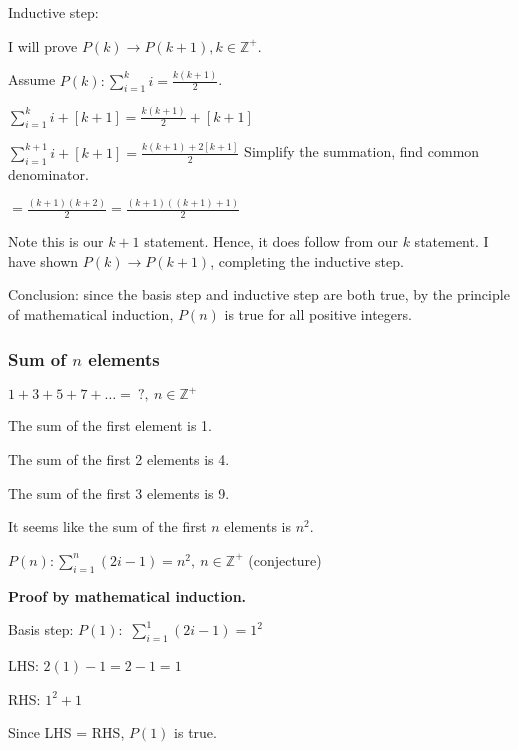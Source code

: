 \documentclass[english,openany]{book}
\begin{document}
    Inductive step:

    I will prove $P(k) \rightarrow P(k+1), k \in \mathbb Z^+$.

    Assume $P(k): \sum_{i=1}^{k} i = \frac{k(k+1)}{2}$.

    \noindent{}

    $\sum_{i=1}^{k} i + [k+1] = \frac{k(k+1)}{2} + [k+1]$

    $\sum_{i=1}^{k+1} i + [k+1] = \frac{k(k+1)+2[k+1]}{2}$ Simplify the summation, find common denominator.

    \qquad \qquad$= \frac{(k+1)(k+2)}{2} = \frac{(k+1)((k+1)+1)}{2}$

    Note this is our $k+1$ statement. Hence, it does follow from our $k$ statement. I have shown $P(k) \rightarrow P(k+1)$, completing the inductive step.

    Conclusion: since the basis step and inductive step are both true, by the principle of mathematical induction, $P(n)$ is true for all positive integers.\\

    \subsubsection{Sum of $n$ elements}

    $1+3+5+7+\dots =\ ?,\ n \in \mathbb Z^+$

    The sum of the first element is 1.

    The sum of the first 2 elements is 4.

    The sum of the first 3 elements is 9.

    It seems like the sum of the first $n$ elements is $n^2$.

    $P(n): \sum_{i=1}^{n} (2i-1) = n^2,\ n \in \mathbb Z^+$ (conjecture)

    \textbf{Proof by mathematical induction.}

    Basis step: $P(1):$ $\sum_{i=1}^{1} (2i-1) = 1^2$

    LHS: $2(1) - 1 = 2-1 = 1$

    RHS: $1^2 + 1$

    Since LHS = RHS, $P(1)$ is true.
\end{document}
